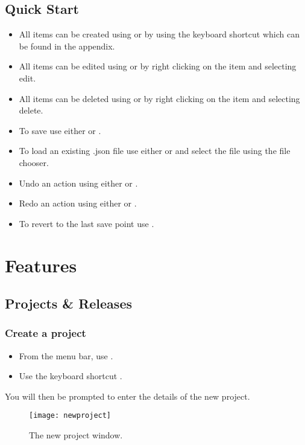 \documentclass[11pt,fleqn]{book} %
\begin{document}
\section{Quick Start}
\begin{itemize}
    \item All items can be created using  or by using the keyboard shortcut which can be found
    in the appendix.
    \item All items can be edited using  or by right clicking on the item and selecting edit.
    \item All items can be deleted using  or by right clicking on the item and selecting delete.
    \item To save use either  or .
    \item To load an existing .json file use either  or  and select the file using the file chooser.
    \item Undo an action using either  or .
    \item Redo an action using either  or .
    \item To revert to the last save point use .
\end{itemize}

\chapter{Features}
\section{Projects \& Releases}
\subsection{Create a project}
    \begin{itemize}
        \item From the menu bar, use .
        \item Use the keyboard shortcut .
    \end{itemize}
    You will then be prompted to enter the details of the new project.

    \begin{figure}[h]
        \centering
        \texttt{[image: newproject]}
        \caption{The new project window.\label{newproject}}
    \end{figure}
\end{document}
